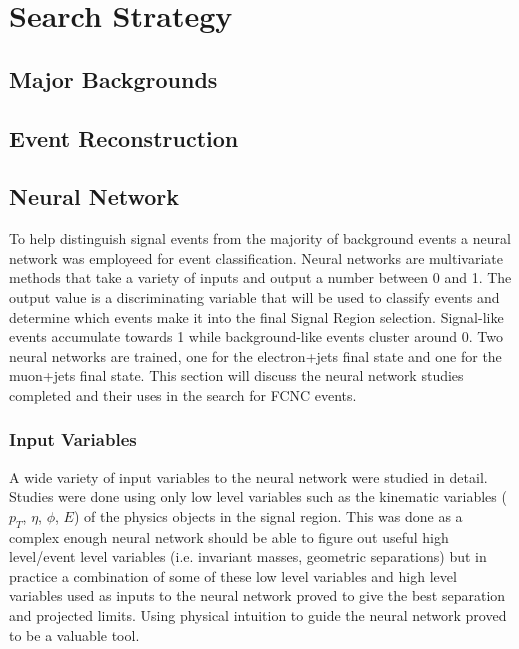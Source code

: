
\chapter{Search Strategy}
\label{ch:SearchStrategy}
\section{Major Backgrounds}
\section{Event Reconstruction}
\section{Neural Network}
\label{sec:NN} 
To help distinguish signal events from the majority of background events a neural network was employeed for event classification.  Neural networks are multivariate methods that take a variety of inputs and output a number between 0 and 1.  The output value is a discriminating variable that will be used to classify events and determine which events make it into the final Signal Region selection.  Signal-like events accumulate towards 1 while background-like events cluster around 0.  Two neural networks are trained, one for the electron+jets final state and one for the muon+jets final state.  This section will discuss the neural network studies completed and their uses in the search for FCNC events.  

\subsection{Input Variables}
A wide variety of input variables to the neural network were studied in detail.  Studies were done using only low level variables such as the kinematic variables  ($p_T$, $\eta$, $\phi$, $E$)  of the physics objects in the signal region.  This was done as a complex enough neural network should be able to figure out useful high level/event level variables (i.e. invariant masses, geometric separations) but in practice a combination of some of these low level variables and high level variables used as inputs to the neural network proved to give the best separation and projected limits.  Using physical intuition to guide the neural network proved to be a valuable tool.

